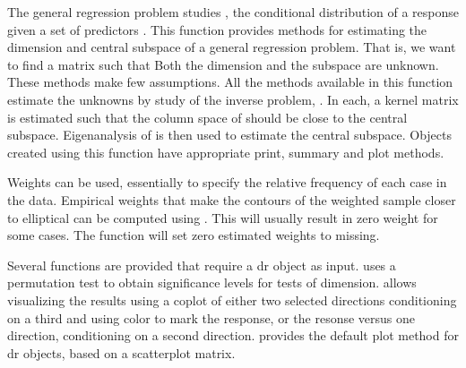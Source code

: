 \begin{Details}\relax
The general regression problem studies , the conditional
distribution of a response  given a set of predictors .  
This function provides methods for estimating the dimension and central
subspace of a general regression problem.  That is, we want to find a 
 matrix  such that 
Both the dimension  and the subspace
 are unknown.  These methods make few assumptions.  All the methods
available in this function estimate the unknowns by study of the inverse
problem, .  In each, a kernel matrix  is estimated such
that the column space of  should be close to the central subspace.
Eigenanalysis of  is then used to estimate the central subspace.
Objects created using this function have appropriate print, summary and plot
methods.

Weights can be used, essentially to specify the relative 
frequency of each case in the data.  Empirical weights that make 
the contours of the weighted sample closer to elliptical can be 
computed using .  
This will usually result in zero weight for some 
cases.  The function will set zero estimated weights to missing.

Several functions are provided that require a dr object as input.  
 uses a permutation test to obtain significance levels
for tests of dimension.   allows visualizing the results using a
coplot of either two selected directions conditioning on a third and using
color to mark the response, or the resonse versus one direction,
conditioning on a second direction.   provides the default plot
method for dr objects, based on a scatterplot matrix.\end{Details}
